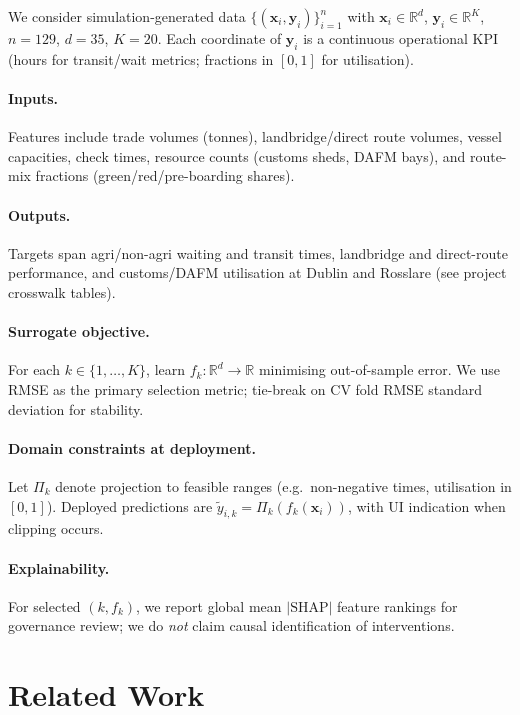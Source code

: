 \documentclass[10pt,twocolumn]{article}
\newcommand{\R}{\mathbb{R}}
\begin{document}
We consider simulation-generated data $\{(\mathbf{x}_i, \mathbf{y}_i)\}_{i=1}^{n}$ with $\mathbf{x}_i \in \R^{d}$, $\mathbf{y}_i \in \R^{K}$, $n{=}129$, $d{=}35$, $K{=}20$.
Each coordinate of $\mathbf{y}_i$ is a continuous operational KPI (hours for transit/wait metrics; fractions in $[0,1]$ for utilisation).

\paragraph{Inputs.}
Features include trade volumes (tonnes), landbridge/direct route volumes, vessel capacities, check times, resource counts (customs sheds, DAFM bays), and route-mix fractions (green/red/pre-boarding shares).

\paragraph{Outputs.}
Targets span agri/non-agri waiting and transit times, landbridge and direct-route performance, and customs/DAFM utilisation at Dublin and Rosslare (see project crosswalk tables).

\paragraph{Surrogate objective.}
For each $k \in \{1,\ldots,K\}$, learn $f_k : \R^{d} \rightarrow \R$ minimising out-of-sample error.
We use RMSE as the primary selection metric; tie-break on CV fold RMSE standard deviation for stability.

\paragraph{Domain constraints at deployment.}
Let $\Pi_k$ denote projection to feasible ranges (e.g.\ non-negative times, utilisation in $[0,1]$).
Deployed predictions are $\tilde{y}_{i,k} = \Pi_k(f_k(\mathbf{x}_i))$, with UI indication when clipping occurs.

\paragraph{Explainability.}
For selected $(k, f_k)$, we report global mean $|\mathrm{SHAP}|$ feature rankings \citep{lundberg2017shap} for governance review; we do \emph{not} claim causal identification of interventions.

\section{Related Work}
\label{sec:related}
\end{document}
